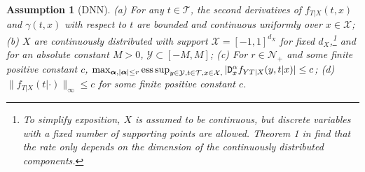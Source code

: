 \documentclass[lettersize, 12pt]{article}
\newtheorem{assumption}{Assumption}
\begin{document}
\begin{assumption}[DNN]
(a) For any $t\in\mathcal{T}$, the second derivatives of $f_{T|X}(t,x)$ and $\gamma(t,x)$ with respect to $t$ are bounded and continuous uniformly over $x\in\mathcal{X}$;
(b) $X$ are continuously distributed with support $\mathcal{X} = [-1,1]^{d_X}$ for fixed $d_X$,\footnote{To simplify exposition, $X$ is assumed to be continuous, but discrete variables with a fixed number of supporting points are allowed.
Theorem 1 in \cite{FLM2} find that the rate only depends on the dimension of the continuously distributed components.
}
and for an absolute constant $M > 0$, $\mathcal{Y} \subset [-M,M]$; 
(c) For $r\in\mathcal{N}_+$ and some finite positive constant $c$, $\max_{\bm{\alpha}, |\bm{\alpha}| \leq r}{\rm ess}\sup_{y \in \mathcal{Y}, t\in\mathcal{T}, x\in\mathcal{X},} |\mathtt{D}_{x}^\alpha f_{YT|X}(y,t|x)| \leq c$;
(d) $\|f_{T|X}(t|\cdot)\|_\infty \leq c$ for some finite positive constant $c$.
\label{ADNN}
\end{assumption}

%
%
%
%
%
\end{document}
